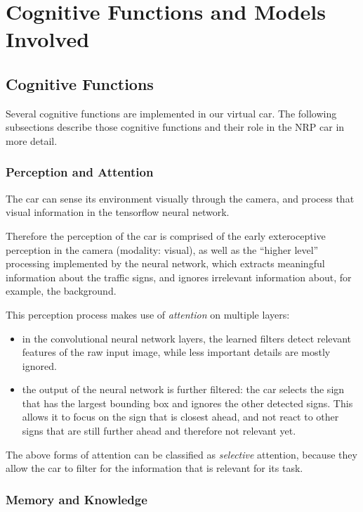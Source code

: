 
\section{Cognitive Functions and Models Involved}

\subsection{Cognitive Functions}
Several cognitive functions are implemented in our virtual car. 
The following subsections describe those cognitive functions and their role in the NRP car in more detail.

\subsubsection{Perception and Attention}
The car can sense its environment visually through the camera, and process that visual information in the tensorflow \cite{tensorflow2015-whitepaper} neural network.

Therefore the perception of the car is comprised of the early exteroceptive perception in the camera (modality: visual), as well as the ``higher level'' processing implemented by the neural network, which extracts meaningful information about the traffic signs, and ignores irrelevant information about, for example, the background. 

This perception process makes use of \emph{attention} on multiple layers:
\begin{itemize}
 \item in the convolutional neural network layers, the learned filters detect relevant features of the raw input image, while less important details are mostly ignored.
 \item the output of the neural network is further filtered: the car selects the sign that has the largest bounding box and ignores the other detected signs. This allows it to focus on the sign that is closest ahead, and not react to other signs that are still further ahead and therefore not relevant yet. 
\end{itemize}
The above forms of attention can be classified as \emph{selective} attention, because they allow the car to filter for the information that is relevant for its task.

\subsubsection{Memory and Knowledge}

